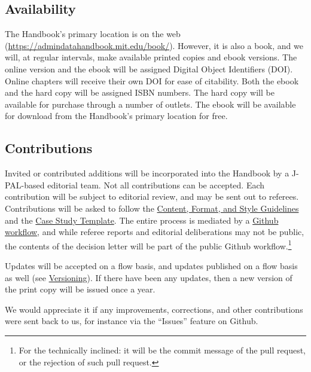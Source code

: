 \documentclass[
]{WileySix}
\begin{document}
\hypertarget{availability}{%
\subsection*{Availability}\label{availability}}

The Handbook's primary location is on the web (\url{https://admindatahandbook.mit.edu/book/}). However, it is also a book, and we will, at regular intervals, make available printed copies and ebook versions. The online version and the ebook will be assigned Digital Object Identifiers (DOI). Online chapters will receive their own DOI for ease of citability. Both the ebook and the hard copy will be assigned ISBN numbers. The hard copy will be available for purchase through a number of outlets. The ebook will be available for download from the Handbook's primary location for free.

\hypertarget{contributions}{%
\subsection*{Contributions}\label{contributions}}

Invited or contributed additions will be incorporated into the Handbook by a J-PAL-based editorial team. Not all contributions can be accepted. Each contribution will be subject to editorial review, and may be sent out to referees. Contributions will be asked to follow the \protect\hyperlink{content-format-and-style-guidelines}{Content, Format, and Style Guidelines} and the \protect\hyperlink{case-study-template}{Case Study Template}. The entire process is mediated by a \href{https://guides.github.com/introduction/flow/}{Github workflow}, and while referee reports and editorial deliberations may not be public, the contents of the decision letter will be part of the public Github workflow.\footnote{For the technically inclined: it will be the commit message of the pull request, or the rejection of such pull request.}

Updates will be accepted on a flow basis, and updates published on a flow basis as well (see \protect\hyperlink{versioning}{Versioning}). If there have been any updates, then a new version of the print copy will be issued once a year.

We would appreciate it if any improvements, corrections, and other contributions were sent back to us, for instance via the ``Issues'' feature on Github.
\end{document}
